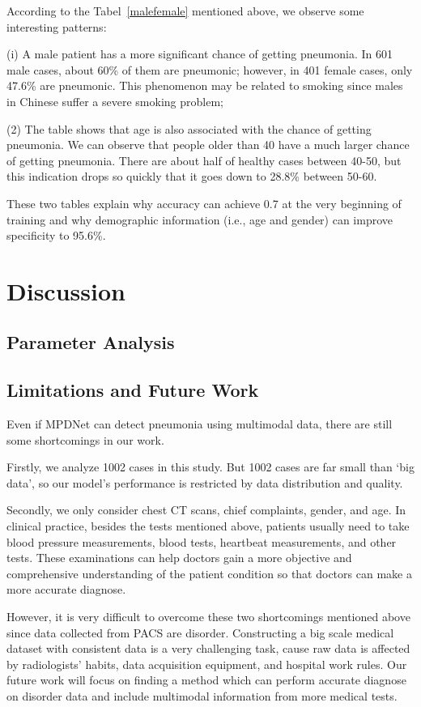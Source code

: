 \documentclass[journal]{IEEEtran}
\begin{document}
According to the Tabel~\ref{malefemale} mentioned above, we observe some interesting patterns:

(i) A male patient has a more significant chance of getting pneumonia. In 601 male cases, about 60\% of them are pneumonic; however, in 401 female cases, only 47.6\% are pneumonic. This phenomenon may be related to smoking since males in Chinese suffer a severe smoking problem; 

(2) The table shows that age is also associated with the chance of getting pneumonia. We can observe that people older than 40 have a much larger chance of getting pneumonia. There are about half of healthy cases between 40-50, but this indication drops so quickly that it goes down to 28.8\% between 50-60. 

These two tables explain why accuracy can achieve 0.7 at the very beginning of training and why demographic information (i.e., age and gender) can improve specificity to 95.6\%.


\section{Discussion}
\label{discuss}

\subsection{Parameter Analysis}

\subsection{Limitations and Future Work}
Even if MPDNet can detect pneumonia using multimodal data, there are still some shortcomings in our work.

Firstly, we analyze 1002 cases in this study. But 1002 cases are far small than `big data', so our model's performance is restricted by data distribution and quality. 

Secondly, we only consider chest CT scans, chief complaints, gender, and age. In clinical practice, besides the tests mentioned above, patients usually need to take blood pressure measurements, blood tests, heartbeat measurements, and other tests. These examinations can help doctors gain a more objective and comprehensive understanding of the patient condition so that doctors can make a more accurate diagnose.

However, it is very difficult to overcome these two shortcomings mentioned above since data collected from PACS are disorder. Constructing a big scale medical dataset with consistent data is a very challenging task, cause raw data is affected by radiologists' habits, data acquisition equipment, and hospital work rules. 
Our future work will focus on finding a method which can perform accurate diagnose on disorder data and include multimodal information from more medical tests.
\end{document}
